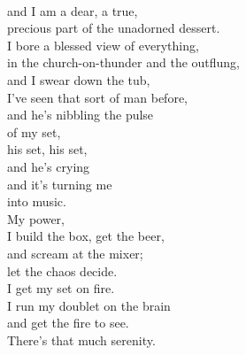 \documentclass[smalldemyvopaper,11pt,twoside,onecolumn,openright,extrafontsizes]{memoir}
\begin{document}
\\and I am a dear, a true,
\\precious part of the unadorned dessert.
\\I bore a blessed view of everything,
\\in the church-on-thunder and the outflung,
\\and I swear down the tub,
\\I've seen that sort of man before,
\\and he's nibbling the pulse
\\of my set,
\\his set, his set,
\\and he's crying
\\and it's turning me
\\into music.
\\My power,
\\I build the box, get the beer,
\\and scream at the mixer;
\\let the chaos decide.
\\I get my set on fire.
\\I run my doublet on the brain
\\and get the fire to see.
\\There's that much serenity.
\end{document}
